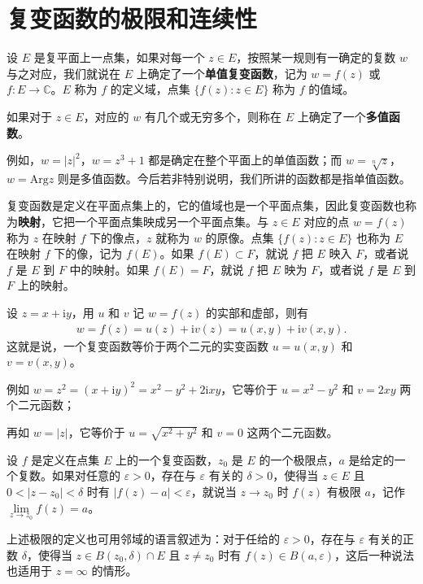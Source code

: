 \documentclass[../../main.tex]{subfiles}
\begin{document}
\section{复变函数的极限和连续性}

\begin{definition}
设 $E$ 是复平面上一点集，如果对每一个 $z \in E$，按照某一规则有一确定的复数 $w$ 与之对应，我们就说在 $E$ 上确定了一个\textbf{单值复变函数}，记为 $w = f(z)$ 或 $f: E \to \mathbb{C}$。$E$ 称为 $f$ 的定义域，点集 $\{ f(z): z \in E\}$ 称为 $f$ 的值域。

如果对于 $z \in E$，对应的 $w$ 有几个或无穷多个，则称在 $E$ 上确定了一个\textbf{多值函数}。
\end{definition}
\begin{note}
例如，$w = |z|^2$，$w = z^3 + 1$ 都是确定在整个平面上的单值函数；而 $w = \sqrt[n]{z}$，$w = \text{Arg}z$ 则是多值函数。今后若非特别说明，我们所讲的函数都是指单值函数。
\end{note}
\begin{remark}
复变函数是定义在平面点集上的，它的值域也是一个平面点集，因此复变函数也称为\textbf{映射}，它把一个平面点集映成另一个平面点集。与 $z \in E$ 对应的点 $w = f(z)$ 称为 $z$ 在映射 $f$ 下的像点，$z$ 就称为 $w$ 的原像。点集 $\{ f(z): z \in E\}$ 也称为 $E$ 在映射 $f$ 下的像，记为 $f(E)$。如果 $f(E) \subset F$，就说 $f$ 把 $E$ 映入 $F$，或者说 $f$ 是 $E$ 到 $F$ 中的映射。如果 $f(E) = F$，就说 $f$ 把 $E$ 映为 $F$，或者说 $f$ 是 $E$ 到 $F$ 上的映射。
\end{remark}

\begin{theorem}
设 $z = x + \mathrm{i}y$，用 $u$ 和 $v$ 记 $w = f(z)$ 的实部和虚部，则有
\begin{align*}
w = f(z) = u(z) + \mathrm{i}v(z)= u(x, y) + \mathrm{i}v(x, y).
\end{align*}
这就是说，一个复变函数等价于两个二元的实变函数 $u = u(x, y)$ 和 $v = v(x, y)$。
\end{theorem}
\begin{note}
例如 $w = z^2 = (x + \mathrm{i}y)^2 = x^2 - y^2 + 2\mathrm{i}xy$，它等价于 $u = x^2 - y^2$ 和 $v = 2xy$ 两个二元函数；

再如 $w = |z|$，它等价于 $u = \sqrt{x^2 + y^2}$ 和 $v = 0$ 这两个二元函数。
\end{note}

\begin{definition}
设 $f$ 是定义在点集 $E$ 上的一个复变函数，$z_0$ 是 $E$ 的一个极限点，$a$ 是给定的一个复数。如果对任意的 $\varepsilon > 0$，存在与 $\varepsilon$ 有关的 $\delta > 0$，使得当 $z \in E$ 且 $0 < |z - z_0| < \delta$ 时有 $|f(z) - a| < \varepsilon$，就说当 $z \to z_0$ 时 $f(z)$ 有极限 $a$，记作 $\lim\limits_{z \to z_0} f(z) = a$。

上述极限的定义也可用邻域的语言叙述为：对于任给的 $\varepsilon > 0$，存在与 $\varepsilon$ 有关的正数 $\delta$，使得当 $z \in B(z_0, \delta) \cap E$ 且 $z \neq z_0$ 时有 $f(z) \in B(a, \varepsilon)$，这后一种说法也适用于 $z = \infty$ 的情形。
\end{definition}
\end{document}
